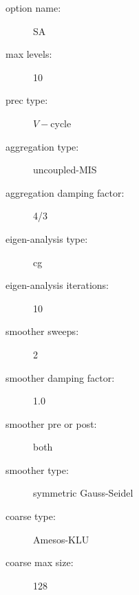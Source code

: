 \begin{description}
  \item[option name:] SA
  \item[max levels:] 10
  \item[prec type:] $V-$cycle
  \item[aggregation type:] uncoupled-MIS
  \item[aggregation damping factor:] 4/3
  \item[eigen-analysis type:] cg
  \item[eigen-analysis iterations:] 10
  \item[smoother sweeps:] 2
  \item[smoother damping factor:] 1.0
  \item[smoother pre or post:] both
  \item[smoother type:] symmetric Gauss-Seidel
  \item[coarse type:] Amesos-KLU
  \item[coarse max size:] 128
\end{description}
